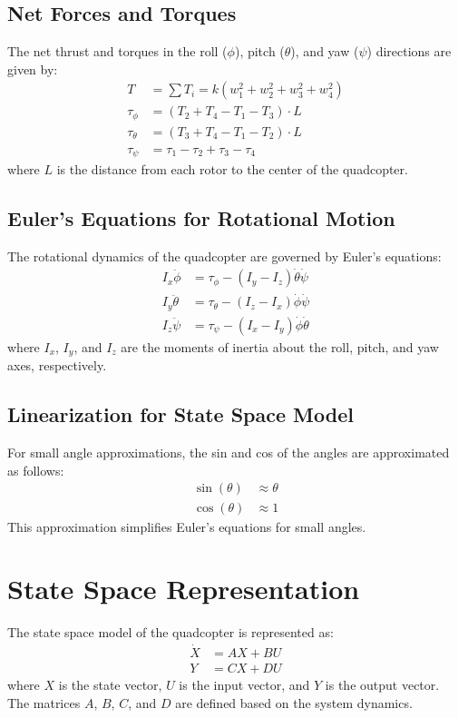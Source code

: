 \documentclass[12pt]{article}
\begin{document}
\subsection{Net Forces and Torques}
The net thrust and torques in the roll ($\phi$), pitch ($\theta$), and yaw ($\psi$) directions are given by:
\begin{align*}
    T &= \sum T_i = k(w_1^2 + w_2^2 + w_3^2 + w_4^2) \\
    \tau_{\phi} &= (T_2 + T_4 - T_1 - T_3) \cdot L \\
    \tau_{\theta} &= (T_3 + T_4 - T_1 - T_2) \cdot L \\
    \tau_{\psi} &= \tau_1 - \tau_2 + \tau_3 - \tau_4
\end{align*}
where $L$ is the distance from each rotor to the center of the quadcopter.

\subsection{Euler’s Equations for Rotational Motion}
The rotational dynamics of the quadcopter are governed by Euler's equations:
\begin{align*}
    I_x \ddot{\phi} &= \tau_{\phi} - (I_y - I_z) \dot{\theta} \dot{\psi} \\
    I_y \ddot{\theta} &= \tau_{\theta} - (I_z - I_x) \dot{\phi} \dot{\psi} \\
    I_z \ddot{\psi} &= \tau_{\psi} - (I_x - I_y) \dot{\phi} \dot{\theta}
\end{align*}
where $I_x$, $I_y$, and $I_z$ are the moments of inertia about the roll, pitch, and yaw axes, respectively.

\subsection{Linearization for State Space Model}
For small angle approximations, the sin and cos of the angles are approximated as follows:
\begin{align*}
    \sin(\theta) &\approx \theta \\
    \cos(\theta) &\approx 1
\end{align*}
This approximation simplifies Euler's equations for small angles.

\section{State Space Representation}
The state space model of the quadcopter is represented as:
\begin{align*}
    \dot{X} &= AX + BU \\
    Y &= CX + DU
\end{align*}
where $X$ is the state vector, $U$ is the input vector, and $Y$ is the output vector. The matrices $A$, $B$, $C$, and $D$ are defined based on the system dynamics.
\end{document}
